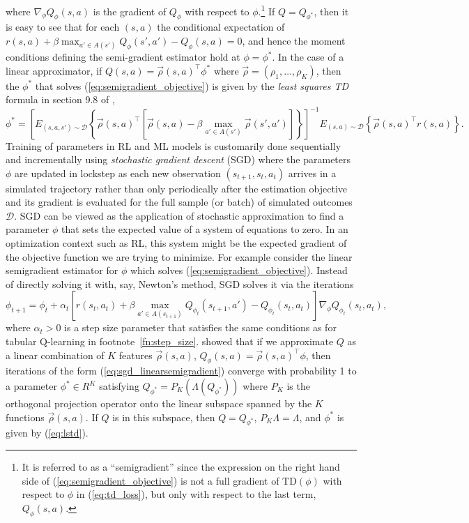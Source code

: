 where $\nabla_\phi Q_\phi(s,a)$ is the gradient of $Q_\phi$ with respect to $\phi$.\footnote{\footnotesize
It is referred to as a ``semigradient'' since the expression on the right hand side
of (\ref{eq:semigradient_objective}) is not a full gradient of  $\mbox{TD}(\phi)$
with respect to $\phi$ in (\ref{eq:td_loss}), but only with respect to the last term, $Q_\phi(s,a)$.}
If $Q=Q_{\phi^*}$, then it is easy
to see that for each $(s,a)$ the conditional expectation of $r(s,a)+\beta  \max_{a' \in A(s')} Q_{\phi}(s', a')-Q_\phi(s,a)=0$,
and hence the moment conditions defining the semi-gradient estimator  hold at $\phi=\phi^*$.
In the case of a linear approximator, if $Q(s,a)=\vec{\rho}(s,a)^{\top}\phi^*$ where $\vec{\rho}=(\rho_1,\ldots,\rho_K)$, then 
the $\phi^*$ that solves (\ref{eq:semigradient_objective}) is given by the {\it least squares TD\/} formula in section 9.8 of \citet{BartoSutton:2020},
\begin{equation}
       \phi^*= \left[E_{(s,a,s') \sim \mathcal{D}}\left\{ \vec{\rho}(s,a)^{\top}[\vec{\rho}(s,a)-\beta \max_{a' \in A(s')}\vec{\rho}(s',a')]\right\}\right]^{-1}
 E_{(s,a) \sim \mathcal{D}}\left\{\vec{\rho}(s,a)^{\top} r(s,a)\right\}.
\label{eq:lstd}
\end{equation}
Training of parameters in RL and ML models is customarily done sequentially and incrementally using 
{\it stochastic gradient descent\/} (SGD) where the parameters $\phi$ are updated in lockstep as each
new observation $(s_{t+1},s_t,a_t)$ arrives in  a simulated trajectory rather than only periodically after
the estimation objective and its gradient is evaluated for the full sample (or batch) of simulated outcomes $\mathcal{D}$. 
SGD can be viewed as the application of stochastic approximation to find a parameter $\phi$ that sets the
expected value of a system of equations to zero. In an optimization context such as RL, this system might be
the expected gradient of the objective function we are trying to minimize. 
For example consider the linear semigradient estimator for $\phi$ which solves (\ref{eq:semigradient_objective}).
Instead of directly solving it with, say, Newton's method, SGD solves it via the iterations
\begin{equation}
           \phi_{t+1}=\phi_t + \alpha_t\left[r(s_t,a_t)+\beta \max_{a' \in A(s_{t+1})} Q_{\phi_t}(s_{t+1},a')-Q_{\phi_t}(s_t,a_t)\right]
\nabla_\phi Q_{\phi_t}(s_t,a_t),
\label{eq:sgd_linearsemigradient}
\end{equation}
where $\alpha_t > 0$ is a step size parameter that satisfies the same conditions
as for tabular Q-learning in footnote~\ref{fn:step_size}. \citet{melo:2008} showed that if we approximate $Q$
as a linear combination of $K$ features $\vec{\rho}(s,a)$, $Q_\phi(s,a)=\vec{\rho}(s,a)^{\top}\phi$, then iterations of the form 
(\ref{eq:sgd_linearsemigradient}) converge with probability 1  to a parameter $\phi^* \in R^K$ satisfying
$Q_{\phi^*}=P_K(\Lambda(Q_{\phi^*}))$ where $P_K$ is the orthogonal projection operator onto the linear subspace 
spanned by the $K$ functions $\vec{\rho}(s,a)$. If $Q$ is in this subspace, then $Q=Q_{\phi^*}$, 
$P_K\Lambda=\Lambda$, and  $\phi^*$ is given by (\ref{eq:lstd}).


